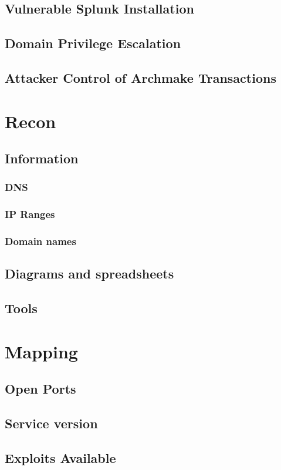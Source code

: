 \documentclass{article}
\begin{document}
\subsection{Vulnerable Splunk Installation}
\subsection{Domain Privilege Escalation}
\subsection{Attacker Control of Archmake Transactions}

\newpage
\section{Recon}
\subsection{Information}
\subsubsection{DNS}
\subsubsection{IP Ranges}
\subsubsection{Domain names}
\subsection{Diagrams and spreadsheets}
\subsection{Tools}

\newpage
\section{Mapping}
\subsection{Open Ports}
\subsection{Service version}
\subsection{Exploits Available}
\end{document}
